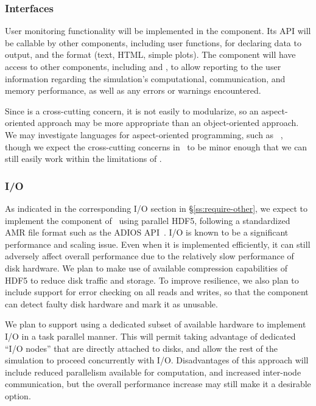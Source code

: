 \documentclass[10pt,twocolumn]{article}
\begin{document}
\subsubsection{Interfaces} \label{sss:design-interfaces}

User monitoring functionality will be implemented in the
 component.  Its API will be callable by other
components, including user functions, for declaring data to output,
and the format (text, HTML, simple plots).  The component will have
access to other components, including  and
, to allow reporting to the user information regarding the
simulation's computational, communication, and memory performance, as
well as any errors or warnings encountered.

Since  is a cross-cutting concern, it is not easily
to modularize, so an aspect-oriented approach may be more appropriate
than an object-oriented approach.  We may investigate languages for
aspect-oriented programming, such as
~\cite{wwwaspectcpp}, though we expect the cross-cutting
concerns in \cello\ to be minor enough that we can still easily work
within the limitations of \cpp.

\subsubsection{I/O} \label{sss:design-io}

As indicated in the corresponding I/O section in
\S\ref{ss:require-other}, we expect to implement the 
component of \cello\ using parallel HDF5, following a standardized AMR
file format such as the ADIOS API~\cite{LoKl08}.  I/O is known to be a
significant performance and scaling issue.  Even when it is
implemented efficiently, it can still adversely affect overall
performance due to the relatively slow performance of disk hardware.
We plan to make use of available compression capabilities of HDF5 to
reduce disk traffic and storage.  To improve resilience, we also plan
to include support for error checking on all reads and writes, so that
the  component can detect faulty disk hardware and mark it
as unusable.

We plan to support using a dedicated subset of available hardware to
implement I/O in a task parallel manner.  This will permit taking
advantage of dedicated ``I/O nodes'' that are directly attached to
disks, and allow the rest of the simulation to proceed concurrently
with I/O.  Disadvantages of this approach will include reduced
parallelism available for computation, and increased inter-node
communication, but the overall performance increase may still make it
a desirable option.
\end{document}
